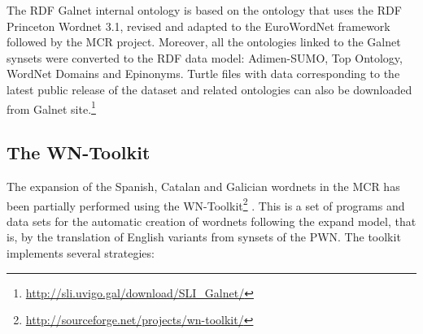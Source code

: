 \documentclass[runningheads]{llncs}
\begin{document}
The RDF Galnet internal ontology is based on the ontology that uses the RDF Princeton Wordnet 3.1, revised and adapted to the EuroWordNet framework followed by the MCR project. Moreover, all the ontologies linked to the Galnet synsets were converted to the RDF data model: Adimen-SUMO, Top Ontology, WordNet Domains and Epinonyms. Turtle files with data corresponding to the latest public release of the dataset and related ontologies can also be downloaded from Galnet site.\footnote{\url{http://sli.uvigo.gal/download/SLI_Galnet/}}


\subsection{The WN-Toolkit}

The expansion of the Spanish, Catalan and Galician wordnets in the MCR has been partially performed using the WN-Toolkit\footnote{\url{http://sourceforge.net/projects/wn-toolkit/}} \cite{oliver2014wn}. This is a set of programs and data sets for the automatic creation of wordnets following the expand model, that is, by the translation of English variants from synsets of the PWN. The toolkit implements several strategies:
\end{document}
